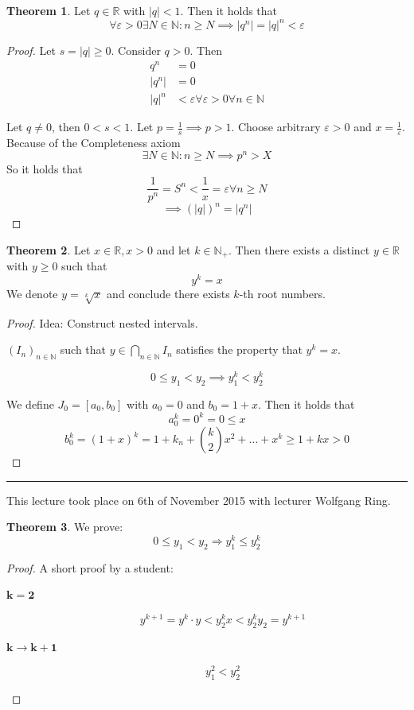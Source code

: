 \documentclass[a4paper,landscape,twocolumn]{article}
\theoremstyle{definition}
\newtheorem{theorem}{Theorem}
\newcommand\abs[1]{\left|#1\right|}
\newcommand\meta[3]{\hrule{} This #1 took place on #2 with lecturer #3.\par}
\begin{document}
\begin{theorem}
  Let $q \in \mathbb R$ with $\abs{q} < 1$. Then it holds that
  \[
    \forall \varepsilon > 0 \exists N \in \mathbb N:
    n \geq N \implies \abs{q^n} = \abs{q}^n < \varepsilon
  \]
\end{theorem}

\begin{proof}
  Let $s = \abs{q} \geq 0$. Consider $q > 0$. Then
  \begin{align*}
    q^n &= 0 \\
    \abs{q^n} &= 0 \\
    \abs{q}^n &< \varepsilon \forall \varepsilon > 0 \forall n \in \mathbb N
  \end{align*}

  Let $q \neq 0$, then $0 < s < 1$. Let $p = \frac1s \implies p > 1$.
  Choose arbitrary $\varepsilon > 0$ and $x = \frac1\varepsilon$.
  Because of the Completeness axiom
  \[ \exists N \in \mathbb N: n \geq N \implies p^n > X \]
  So it holds that
  \[ \frac1{p^n} = S^n < \frac1x = \varepsilon \forall n \geq N \]
  \[ \implies \left(\abs{q}\right)^n = \abs{q^n} \]
\end{proof}

\begin{theorem}
  Let $x \in \mathbb R, x > 0$ and let $k \in \mathbb N_+$.
  Then there exists a distinct $y \in \mathbb R$ with $y \geq 0$
  such that
  \[ y^k = x \]
  We denote $y = \sqrt[k]{x}$ and conclude there exists $k$-th root numbers.
\end{theorem}

\begin{proof}
  Idea: Construct nested intervals.

  $(I_n)_{n \in \mathbb N}$ such that $y \in \bigcap_{n \in \mathbb N} I_n$
  satisfies the property that $y^k = x$.

  \[ 0 \leq y_1 < y_2 \implies y_1^k < y_2^k \]

  We define $J_0 = [a_0, b_0]$ with $a_0 = 0$ and $b_0 = 1 + x$.
  Then it holds that
  \[ a_0^k = 0^k = 0 \leq x \]
  \[ b_0^k = (1 + x)^k = 1 + k_n + \binom{k}{2} x^2 + \dots + x^k \geq 1 + kx > 0 \]
\end{proof}

\meta{lecture}{6th of November 2015}{Wolfgang Ring}

\begin{theorem}
  We prove:
  \[ 0 \leq y_1 < y_2 \Rightarrow y_1^k \leq y_2^k \]
\end{theorem}
\begin{proof}
  A short proof by a student:
  \begin{description}
    \item[$\mathbf{k = 2}$]
      \[ y^{k+1} = y^k \cdot y < y_2^k x < y_2^k y_2 = y^{k+1} \]
    \item[$\mathbf{k \rightarrow k + 1}$]
      \[ y_1^2 < y_2^2 \]
  \end{description}
\end{proof}
\end{document}
